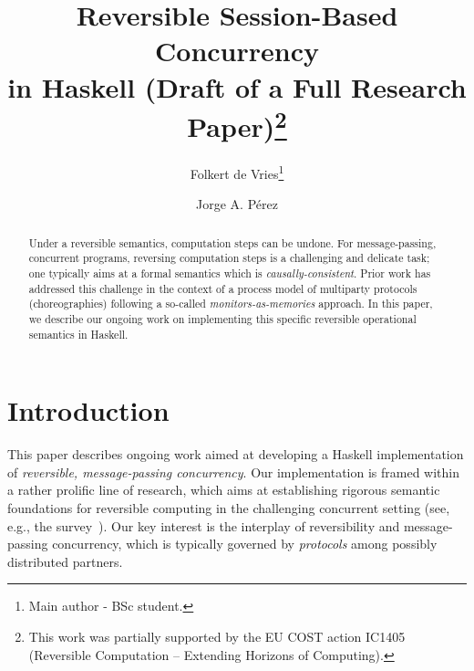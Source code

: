 \documentclass[runningheads]{llncs}
\institute{University of Groningen, The Netherlands, \\ \texttt{}}
\begin{document}
%
\title{Reversible Session-Based Concurrency \\ in Haskell (Draft of a Full Research Paper)\thanks{This work was partially supported by the EU COST action IC1405 (Reversible Computation -- Extending Horizons of Computing).}}
%
%
\author{Folkert de Vries\thanks{Main author - BSc student.} \and
Jorge A. P\'{e}rez%
}
%
%
%
\maketitle              %
%
\begin{abstract}
Under a reversible semantics, computation steps can be undone. 
For message-passing, concurrent programs, reversing computation steps is a challenging and delicate task; one typically aims at a formal semantics which is \emph{causal\-ly-consistent}. 
Prior work has addressed this challenge in the context of a process model of multiparty protocols (choreographies) following a so-called \emph{monitors-as-memories} approach.
In this paper, we describe our ongoing work on implementing this specific reversible operational semantics in Haskell. 
\end{abstract}
%
%
%
\section{Introduction}
This paper describes ongoing work aimed at developing a Haskell implementation of 
\emph{reversible, message-passing concurrency}. 
Our implementation is framed within a rather prolific line of research, which aims at  
establishing rigorous semantic foundations for reversible computing in the challenging 
concurrent setting (see, e.g., the survey~\cite{DBLP:journals/eatcs/Lanese14}).
Our key interest is the interplay of reversibility and message-passing concurrency, which is typically governed by
\emph{protocols} among possibly distributed partners.
\end{document}
